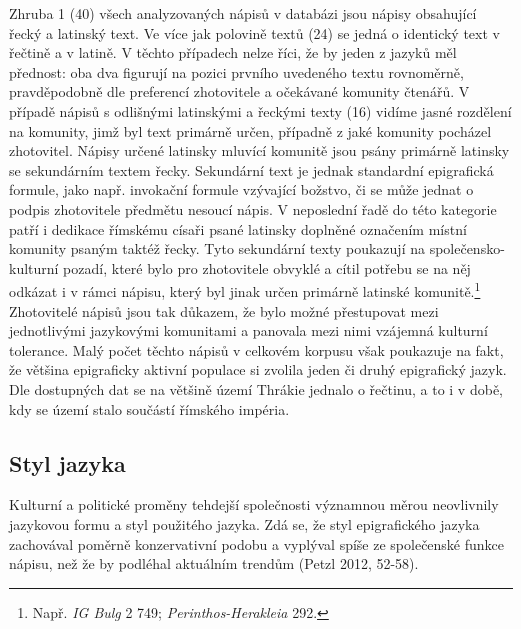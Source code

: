 Zhruba 1  (40) všech analyzovaných nápisů v databázi jsou nápisy obsahující řecký a latinský text. Ve více jak polovině textů (24) se jedná o identický text v řečtině a v latině. V těchto případech nelze říci, že by jeden z jazyků měl přednost: oba dva figurují na pozici prvního uvedeného textu rovnoměrně, pravděpodobně dle preferencí zhotovitele a očekávané komunity čtenářů. V případě nápisů s odlišnými latinskými a řeckými texty (16) vidíme jasné rozdělení na komunity, jimž byl text primárně určen, případně z jaké komunity pocházel zhotovitel. Nápisy určené latinsky mluvící komunitě jsou psány primárně latinsky se sekundárním textem řecky. Sekundární text je jednak standardní epigrafická formule, jako např. invokační formule vzývající božstvo, či se může jednat o podpis zhotovitele předmětu nesoucí nápis. V neposlední řadě do této kategorie patří i dedikace římskému císaři psané latinsky doplněné označením místní komunity psaným taktéž řecky. Tyto sekundární texty poukazují na společensko-kulturní pozadí, které bylo pro zhotovitele obvyklé a cítil potřebu se na něj odkázat i v rámci nápisu, který byl jinak určen primárně latinské komunitě.\footnote{Např. {\em IG Bulg} 2 749; {\em Perinthos-Herakleia} 292.} Zhotovitelé nápisů jsou tak důkazem, že bylo možné přestupovat mezi jednotlivými jazykovými komunitami a panovala mezi nimi vzájemná kulturní tolerance. Malý počet těchto nápisů v celkovém korpusu však poukazuje na fakt, že většina epigraficky aktivní populace si zvolila jeden či druhý epigrafický jazyk. Dle dostupných dat se na většině území Thrákie jednalo o řečtinu, a to i v době, kdy se území stalo součástí římského impéria.

\subsection[styl-jazyka]{Styl jazyka}

Kulturní a politické proměny tehdejší společnosti významnou měrou neovlivnily jazykovou formu a styl použitého jazyka. Zdá se, že styl epigrafického jazyka zachovával poměrně konzervativní podobu a vyplýval spíše ze společenské funkce nápisu, než že by podléhal aktuálním trendům (Petzl 2012, 52-58).

